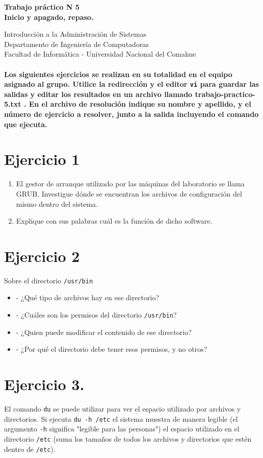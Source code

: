 \documentclass[12pt]{article}
\def\maketitle{

 \makeatletter
 {\color{bl} \centering \huge \sc \textbf{
Trabajo práctico N 5 \\
\large \vspace*{-8pt} \color{black} Inicio y apagado, repaso. 
 \vspace*{8pt} }\par}
 \makeatother


 \makeatletter
 {\centering \small 
	Introducción a la Administración de Sistemas \\
 	Departamento de Ingeniería de Computadoras \\
 	Facultad de Informática - Universidad Nacional del Comahue \\
 	\vspace{20pt} }
 \makeatother

}
\begin{document}
\thispagestyle{empty}
\maketitle
\setlength{\parindent}{0pt}

\paragraph{Los siguientes ejercicios se realizan en su totalidad en el equipo asignado al grupo.
Utilice la redirección y el editor \texttt{vi} para guardar las salidas y editar los resultados 
en un archivo llamado trabajo-practico-5.txt . En el archivo de resolución indique su nombre y apellido, 
y el número de ejercicio a resolver, junto a la salida incluyendo el comando que ejecuta. }

\section{Ejercicio 1}

\begin{enumerate}
\item El gestor de arranque utilizado por las máquinas del laboratorio se llama GRUB. Investigue 
dónde se encuentran los archivos de configuración del mismo dentro del sistema. 
\item Explique con sus palabras cuál es la función de dicho software.
\end{enumerate}


\section{Ejercicio 2}
Sobre el directorio \texttt{/usr/bin}

\begin{itemize}
\item - ¿Qué tipo de archivos hay en ese directorio?
\item - ¿Cuáles son los permisos del directorio \texttt{/usr/bin}?
\item - ¿Quien puede modificar el contenido de ese directorio?
\item - ¿Por qué el directorio debe tener esos permisos, y no otros?
\end{itemize}


\section{Ejercicio 3.}
El comando \texttt{du} se puede utilizar para ver el espacio utilizado por archivos y directorios.
Si ejecuta \texttt{du -h /etc} el sistema muestra de manera legible (el argumento \texttt{-h} significa "legible para las personas")
el espacio utilizado en el directorio \texttt{/etc} (suma los tamaños de todos los archivos y directorios que estén dentro de \texttt{/etc}).
\end{document}
